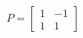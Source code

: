 \documentclass[preview]{standalone}
\begin{document}
\begin{align*}
P = \begin{bmatrix} 1 & -1 \\ 1 & 1 \end{bmatrix}
\end{align*}
\end{document}
